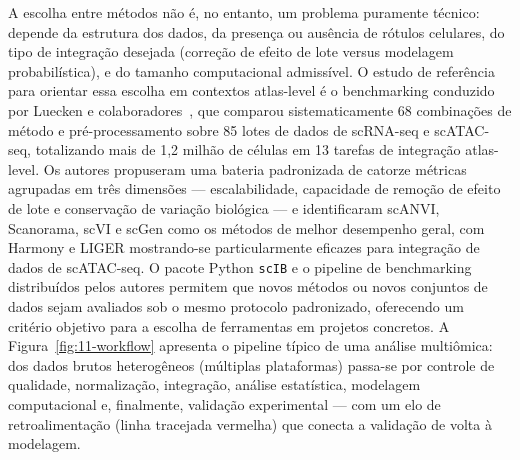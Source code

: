 A escolha entre métodos não é, no entanto, um problema puramente técnico:
depende da estrutura dos dados, da presença ou ausência de rótulos
celulares, do tipo de integração desejada (correção de efeito de lote
versus modelagem probabilística), e do tamanho computacional admissível.
O estudo de referência para orientar essa escolha em contextos atlas-level
é o benchmarking conduzido por Luecken e colaboradores~\cite{luecken2022},
que comparou sistematicamente 68 combinações de método e pré-processamento
sobre 85 lotes de dados de scRNA-seq e scATAC-seq, totalizando mais de 1,2
milhão de células em 13 tarefas de integração atlas-level. Os autores
propuseram uma bateria padronizada de catorze métricas agrupadas em três
dimensões --- escalabilidade, capacidade de remoção de efeito de lote e
conservação de variação biológica --- e identificaram scANVI, Scanorama,
scVI e scGen como os métodos de melhor desempenho geral, com Harmony e
LIGER mostrando-se particularmente eficazes para integração de dados de
scATAC-seq. O pacote Python \texttt{scIB} e o pipeline de benchmarking
distribuídos pelos autores permitem que novos métodos ou novos conjuntos
de dados sejam avaliados sob o mesmo protocolo padronizado, oferecendo
um critério objetivo para a escolha de ferramentas em projetos concretos. A
Figura~\ref{fig:11-workflow} apresenta o pipeline típico de uma análise
multiômica: dos dados brutos heterogêneos (múltiplas plataformas) passa-se
por controle de qualidade, normalização, integração, análise estatística,
modelagem computacional e, finalmente, validação experimental --- com um
elo de retroalimentação (linha tracejada vermelha) que conecta a
validação de volta à modelagem.

